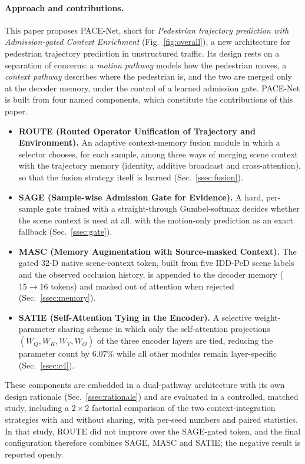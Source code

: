 \paragraph{Approach and contributions.} This paper proposes PACE-Net, short for \emph{Pedestrian trajectory prediction with Admission-gated Context Enrichment} (Fig.~\ref{fig:overall}), a new architecture for pedestrian trajectory prediction in unstructured traffic. Its design rests on a separation of concerns: a \emph{motion pathway} models how the pedestrian moves, a \emph{context pathway} describes where the pedestrian is, and the two are merged only at the decoder memory, under the control of a learned admission gate. PACE-Net is built from four named components, which constitute the contributions of this paper.
\begin{itemize}[leftmargin=1.4em,itemsep=1pt,topsep=2pt]
\item \textbf{ROUTE (Routed Operator Unification of Trajectory and Environment).} An adaptive context-memory fusion module in which a selector chooses, for each sample, among three ways of merging scene context with the trajectory memory (identity, additive broadcast and cross-attention), so that the fusion strategy itself is learned (Sec.~\ref{ssec:fusion}).
\item \textbf{SAGE (Sample-wise Admission Gate for Evidence).} A hard, per-sample gate trained with a straight-through Gumbel-softmax decides whether the scene context is used at all, with the motion-only prediction as an exact fallback (Sec.~\ref{ssec:gate}).
\item \textbf{MASC (Memory Augmentation with Source-masked Context).} The gated 32-D native scene-context token, built from five IDD-PeD scene labels and the observed occlusion history, is appended to the decoder memory ($15\!\to\!16$ tokens) and masked out of attention when rejected (Sec.~\ref{ssec:memory}).
\item \textbf{SATIE (Self-Attention Tying in the Encoder).} A selective weight-parameter sharing scheme in which only the self-attention projections $(W_Q,W_K,W_V,W_O)$ of the three encoder layers are tied, reducing the parameter count by $6.07\%$ while all other modules remain layer-specific (Sec.~\ref{ssec:c4}).
\end{itemize}
These components are embedded in a dual-pathway architecture with its own design rationale (Sec.~\ref{ssec:rationale}) and are evaluated in a controlled, matched study, including a $2{\times}2$ factorial comparison of the two context-integration strategies with and without sharing, with per-seed numbers and paired statistics. In that study, ROUTE did not improve over the SAGE-gated token, and the final configuration therefore combines SAGE, MASC and SATIE; the negative result is reported openly.
